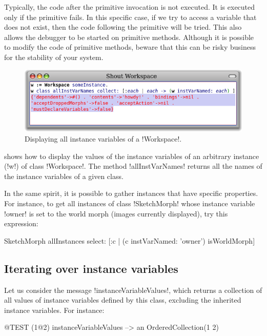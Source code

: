 \documentclass[a4paper,10pt,twoside]{book}
\begin{document}
Typically, the code after the primitive invocation is not executed.
It is executed only if the primitive fails. In this specific case, if we try to access a variable that does not exist, then the code following the primitive will be tried.
This also allows the debugger to be started on primitive methods.
Although it is possible to modify the code of primitive methods, beware that this can be risky business for the stability of your \pharo system.

\begin{figure}[ht]\centering
	\includegraphics[width=0.8\linewidth]{allInstanceVariables}
	\caption{Displaying all instance variables of a \ct!Workspace!.\label{fig:allInstanceVariables}}
\end{figure}

 shows how to display the values of the instance variables of an arbitrary instance (\ct!w!) of class \ct!Workspace!.
The method \ct!allInstVarNames! returns all the names of the instance variables of a given class.

In the same spirit, it is possible to gather instances that have specific properties.
For instance, to get all instances of class \ct!SketchMorph! whose instance variable \ct!owner! is set to the world morph (\ie images currently displayed), try this expression:
\begin{code}{}
SketchMorph allInstances select: [:c | (c instVarNamed: 'owner') isWorldMorph]
\end{code}

\subsection{Iterating over instance variables}

Let us consider the message \ct!instanceVariableValues!, which returns a collection of all values of instance variables defined by this class, excluding the inherited instance variables.
For instance:
\begin{code}{@TEST}
(1@2) instanceVariableValues --> an OrderedCollection(1 2)
\end{code}
\end{document}
